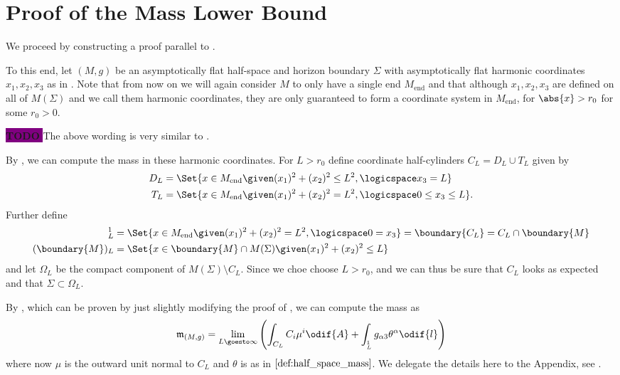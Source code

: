 \documentclass[titlepage,numbers=noenddot,headinclude,oneside,%
footinclude=true,cleardoublepage=empty,%
BCOR=5mm,paper=a4,fontsize=11pt,%
english,%
]{scrartcl}
\let\sphere\relax
\newcommand{\sphere}{\mathbb{S}}
\newcommand{\Mend}{M_{\mathrm{end}}} %
\newcommand{\mass}[2]{\mathfrak{m}_{(#1,#2)}} %
\newcommand{\todomark}{%
    \colorbox{purple}{%
        \textnormal\ttfamily\bfseries\color{white}%
        TODO%
    }%
}
\newcommand{\todo}[1][]{%
    \ifstrempty{#1}{%
        \def\todotext{Todo}%
    }{%
        \def\todotext{Todo: #1}%
    }%
    \todomark%
    {%
        \marginpar{%
            \raggedright\normalfont\sffamily\scriptsize\todotext%
        }%
    }%
}
\begin{document}
\section{Proof of the Mass Lower Bound}
We proceed by constructing a proof parallel to \cite[Section 6]{brayHarmonicFunctionsMass2019}.%

To this end, let \( (M,g) \) be an asymptotically flat half-space and horizon boundary \( \Sigma \) with asymptotically flat harmonic coordinates \( x_1,x_2,x_3 \) as in . Note that from now on we will again consider \( M \) to only have a single end \( \Mend \) and that although \( x_1,x_2,x_3 \) are defined on all of \( M(\Sigma) \) and we call them harmonic coordinates, they are only guaranteed to form a coordinate system in \( \Mend \), \ie for \( \abs{x}>r_0 \) for some \( r_0>0 \).

\todo{The above wording is very similar to \cite[Section 6]{hirschSpacetimeHarmonicFunctions2021}.}

By \cite[Proposition 3.7]{almarazPositiveMassTheorem2016}, we can compute the mass in these harmonic coordinates. For \( L>r_0 \) define coordinate half-cylinders \( C_L=D_L\cup T_L \) given by
\begin{align*}
    D_L&=\Set{x\in \Mend\given (x_1)^2+(x_2)^2\leq L^2,\logicspace x_3=L}\\
    T_L&=\Set{x\in \Mend\given (x_1)^2+(x_2)^2=L^2,\logicspace 0\leq x_3\leq L}.
\end{align*}
Further define
\begin{align*}
    \sphere_L^1&=\Set{x\in \Mend \given (x_1)^2+(x_2)^2=L^2,\logicspace 0=x_3}=\boundary{C_L}=C_L\cap \boundary{M}\\
    (\boundary{M})_L&=\Set{x\in \boundary{M}\cap M(\Sigma)\given (x_1)^2+(x_2)^2\leq L}
\end{align*}
and let \( \Omega_L \) be the compact component of \( M(\Sigma)\setminus C_L \). Since we choe choose \( L>r_0 \), and we can thus be sure that \( C_L  \) looks as expected and that \( \Sigma\subset \Omega_L \).

By , which can be proven by just slightly modifying the proof of \cite[Proposition 3.7]{almarazPositiveMassTheorem2016}, we can compute the mass as
\begin{equation*}
    \mass{M}{g}=\lim_{L \goesto \infty}\left( \int_{C_L}C_i\mu^i\odif{A}+\int_{\sphere^1_L}g_{\alpha 3}\theta^\alpha\odif{l} \right)
\end{equation*}
where now \( \mu \) is the outward unit normal to \( C_L \) and \( \theta \) is as in \( \Cref{def:half_space_mass} \). We delegate the details here to the Appendix, see .
\end{document}
